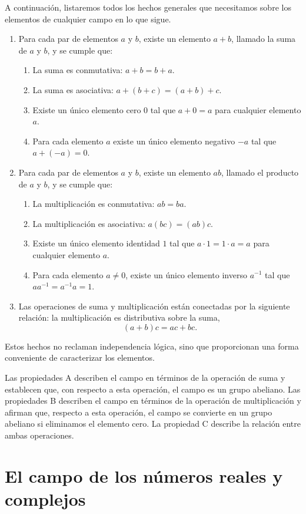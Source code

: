 A continuación, listaremos todos los hechos generales que necesitamos sobre los elementos de cualquier campo en lo que sigue.
\begin{enumerate}[label=\Alph*.]
    \item Para cada par de elementos $a$ y $b$, existe un elemento $a + b$, llamado la suma de $a$ y $b$, y se cumple que:
    \begin{enumerate}[label=\arabic*.]
        \item La suma es conmutativa: $a + b = b + a$.
        \item La suma es asociativa: $a + (b + c) = (a + b) + c$.
        \item Existe un único elemento cero $0$ tal que $a + 0 = a$ para cualquier elemento $a$.
        \item Para cada elemento $a$ existe un único elemento negativo $-a$ tal que $a + (-a) = 0$.
    \end{enumerate}
    \item Para cada par de elementos $a$ y $b$, existe un elemento $ab$, llamado el producto de $a$ y $b$, y se cumple que:
    \begin{enumerate}[label=\arabic*.]
        \item La multiplicación es conmutativa: $ab = ba$.
        \item La multiplicación es asociativa: $a (bc) = (ab) c$.
        \item Existe un único elemento identidad $1$ tal que $a \cdot 1 = 1 \cdot a = a$ para cualquier elemento $a$.
        \item Para cada elemento $a \neq 0$, existe un único elemento inverso $a^{-1}$ tal que $aa^{-1} = a^{-1}a = 1$.
    \end{enumerate}
    \item Las operaciones de suma y multiplicación están conectadas por la siguiente relación: la multiplicación es distributiva sobre la suma,
    $$(a + b) c = ac + bc.$$
\end{enumerate}
Estos hechos no reclaman independencia lógica, sino que proporcionan una forma conveniente de caracterizar los elementos.

Las propiedades A describen el campo en términos de la operación de suma y establecen que, con respecto a esta operación, el campo es un grupo abeliano. Las propiedades B describen el campo en términos de la operación de multiplicación y afirman que, respecto a esta operación, el campo se convierte en un grupo abeliano si eliminamos el elemento cero. La propiedad C describe la relación entre ambas operaciones.

\section{El campo de los números reales y complejos}